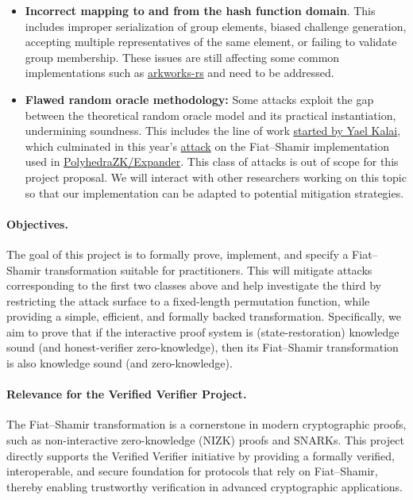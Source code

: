 \documentclass{article}
\begin{document}
\begin{itemize}
    \item \textbf{Incorrect mapping to and from the hash function domain}. This includes improper serialization of group elements, biased challenge generation, accepting multiple representatives of the same element, or failing to validate group membership. These issues are still affecting some common implementations such as \href{https://github.com/arkworks-rs/crypto-primitives/blob/main/crypto-primitives/src/snark/constraints.rs#L163}{arkworks-rs} and need to be addressed.

    \item \textbf{Flawed random oracle methodology:} Some attacks exploit the gap between the theoretical random oracle model and its practical instantiation, undermining soundness. This includes the line of work \href{https://dl.acm.org/doi/10.5555/946243.946302}{started by Yael Kalai}, which culminated in this year's \href{https://eprint.iacr.org/2025/118}{attack} on the Fiat--Shamir implementation used in \href{https://github.com/PolyhedraZK/Expander/}{PolyhedraZK/Expander}. This class of attacks is out of scope for this project proposal. We will interact with other researchers working on this topic so that our implementation can be adapted to potential mitigation strategies.
\end{itemize}


\paragraph{Objectives.}
The goal of this project is to formally prove, implement, and specify a Fiat--Shamir transformation suitable for practitioners. This will mitigate attacks corresponding to the first two classes above and help investigate the third by restricting the attack surface to a fixed-length permutation function, while providing a simple, efficient, and formally backed transformation.
Specifically, we aim to prove that if the interactive proof system is (state-restoration) knowledge sound (and honest-verifier zero-knowledge), then its Fiat--Shamir transformation is also knowledge sound (and zero-knowledge).



\paragraph{Relevance for the Verified Verifier Project.} The Fiat--Shamir transformation is a cornerstone in modern cryptographic proofs, such as non-interactive zero-knowledge (NIZK) proofs and SNARKs. This project directly supports the Verified Verifier initiative by providing a formally verified, interoperable, and secure foundation for protocols that rely on Fiat--Shamir, thereby enabling trustworthy verification in advanced cryptographic applications.
\end{document}

